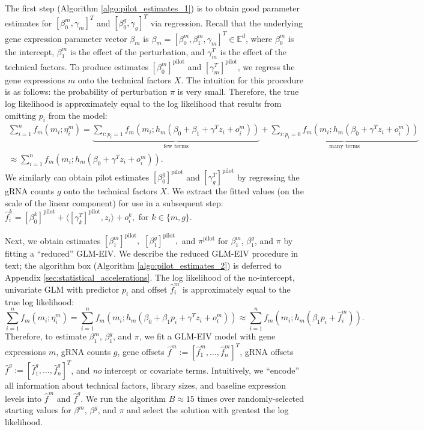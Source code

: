 \documentclass[12pt]{article}
\begin{document}
The first step (Algorithm \ref{algo:pilot_estimates_1}) is to obtain good parameter estimates for $[\beta^m_0, \gamma_m]^T$ and $[\beta^g_0, \gamma_g]^T$ via regression. Recall that the underlying gene expression parameter vector $\beta_m$ is $\beta_m = [\beta^m_0, \beta^m_1, \gamma_m]^T \in \mathbb{E}^d$, where $\beta^m_0$ is the intercept, $\beta^m_1$ is the effect of the perturbation, and $\gamma_m^T$ is the effect of the technical factors. To produce estimates $[\beta^m_0]^\textrm{pilot}$ and $[\gamma_m^T]^\textrm{pilot}$, we regress the gene expressions $m$ onto the technical factors $X$. The intuition for this procedure is as follows: the probability of perturbation $\pi$ is very small. Therefore, the true log likelihood is approximately equal to the log likelihood that results from omitting $p_i$ from the model:
\begin{multline*}
\sum_{i=1}^n f_m(m_i; \eta^m_i) = \underbrace{\sum_{i : p_i =1} f_m(m_i; h_m(\beta_0 + \beta_1 + \gamma^T z_i + o^m_i))}_\textrm{few terms}  + \underbrace{\sum_{i : p_i = 0} f_m(m_i; h_m(\beta_0 + \gamma^T z_i + o^m_i))}_\textrm{many terms} \\ \approx \sum_{i = 1}^n f_m(m_i; h_m(\beta_0 + \gamma^T z_i + o^m_i)).
\end{multline*}
We similarly can obtain pilot estimates $[\beta^g_0]^\textrm{pilot}$ and $[\gamma^T_g]^\textrm{pilot}$ by regressing the gRNA counts $g$ onto the technical factors $X$. We extract the fitted values (on the scale of the linear component) for use in a subsequent step: $\hat{f}^k_i = [\beta^k_0]^\textrm{pilot} + \langle [\gamma^T_k]^\textrm{pilot}, z_i \rangle + o^k_i,$ for $k \in \{m,g\}$.

Next, we obtain estimates $[\beta_1^m]^\textrm{pilot},$ $[\beta_1^g]^\textrm{pilot},$ and $\pi^\textrm{pilot}$ for $\beta^m_1$, $\beta^g_1$, and $\pi$ by fitting a ``reduced'' GLM-EIV. We describe the reduced GLM-EIV procedure in text; the algorithm box (Algorithm \ref{algo:pilot_estimates_2}) is deferred to Appendix \ref{sec:statistical_accelerations}. The log likelihood of the no-intercept, univariate GLM with predictor $p_i$ and offset $\hat{f}^m_i$ is approximately equal to the true log likelihood:
$$ \sum_{i=1}^n f_m(m_i; \eta^m_i) =
\sum_{i=1}^n f_m(m_i; h_m(\beta_0 + \beta_1 p_i + \gamma^T z_i + o^m_i)) \approx \sum_{i=1}^n f_m(m_i; h_m( \beta_1 p_i + \hat{f}^m_i)).
$$
Therefore, to estimate $\beta^m_1$, $\beta^g_1$, and $\pi$, we fit a GLM-EIV model with gene expressions $m$, gRNA counts $g$, gene offsets $\hat{f}^m := [\hat{f}^m_1, \dots, \hat{f}^m_n]^T$, gRNA offsets $\hat{f}^g := [\hat{f}^g_1, \dots, \hat{f}^g_n]^T$, and \textit{no} intercept or covariate terms. Intuitively, we ``encode'' all information about technical factors, library sizes, and baseline expression levels into $\hat{f}^m$ and $\hat{f}^g$. We run the algorithm $B \approx 15$ times over randomly-selected starting values for $\beta^m$, $\beta^g$, and $\pi$ and select the solution with greatest the log likelihood.
\end{document}
